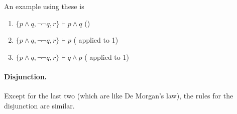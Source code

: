 \begin{prooftree}
\end{prooftree}

\begin{prooftree}
\end{prooftree}

An example using these is
\begin{enumerate}
    \item $\{p\wedge q, \neg\neg q, r\}\vdash p\wedge q$ \hfill ()
    \item $\{p\wedge q, \neg\neg q, r\}\vdash p$ \hfill ( applied to 1)
    \item $\{p\wedge q, \neg\neg q, r\}\vdash q\wedge p$ \hfill ( applied to 1)
\end{enumerate}

\paragraph{Disjunction.}

Except for the last two (which are like De Morgan's law), the rules for the disjunction are similar.

\begin{prooftree}
\end{prooftree}

\begin{prooftree}
\end{prooftree}

\begin{prooftree}
\end{prooftree}

\begin{prooftree}
\end{prooftree}

